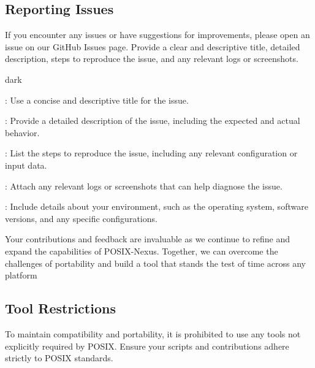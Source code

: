 \subsection{Reporting Issues}
\label{sec:introduction:sub:report}
If you encounter any issues or have suggestions for improvements, please open an issue on our GitHub Issues page.
Provide a clear and descriptive title, detailed description, steps to reproduce the issue, and any relevant logs or screenshots.
\bigskip
\begin{baseBoxOne}{}{dark}
    \begin{posnexItemize}
        \item[\sA] : Use a concise and descriptive title for the issue.
        \item[\sA] : Provide a detailed description of the issue, including the expected and actual behavior.
        \item[\sA] : List the steps to reproduce the issue, including any relevant configuration or input data.
        \item[\sA] : Attach any relevant logs or screenshots that can help diagnose the issue.
        \item[\sA] : Include details about your environment, such as the operating system, software versions, and any specific configurations.
    \end{posnexItemize}
\end{baseBoxOne}
\bigskip
Your contributions and feedback are invaluable as we continue to refine and expand the capabilities of POSIX-Nexus.
Together, we can overcome the challenges of portability and build a tool that stands the test of time across any platform

\subsection{Tool Restrictions}
\label{sec:introduction:sub:restrict}
To maintain compatibility and portability, it is prohibited to use any tools not explicitly required by POSIX.
Ensure your scripts and contributions adhere strictly to POSIX standards.

